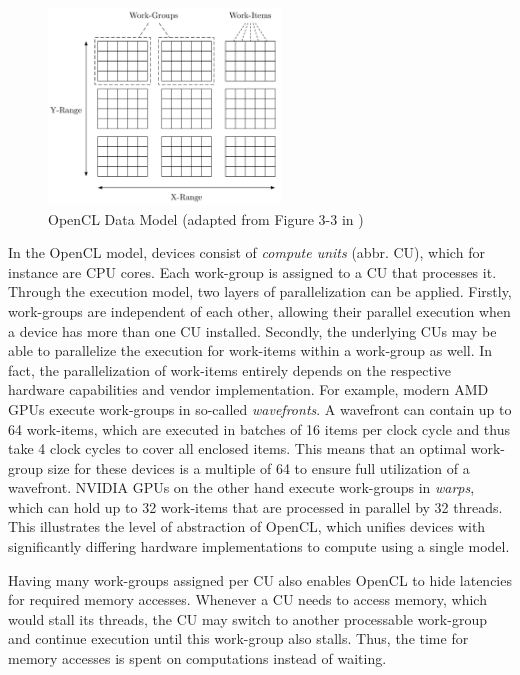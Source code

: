 \begin{figure}[!htb]
	\includegraphics[width=0.55\textwidth]{drawings/opencl_data_model.pdf}
	\centering
	\caption{OpenCL Data Model (adapted from Figure 3-3 in \cite{opencl_spec})}
	\label{img:opencl_data_model}
\end{figure}

In the OpenCL model, devices consist of \textit{compute units} (abbr. CU), which for instance are CPU cores. Each work-group is assigned to a CU that processes it. Through the execution model, two layers of parallelization can be applied. Firstly, work-groups are independent of each other, allowing their parallel execution when a device has more than one CU installed. Secondly, the underlying CUs may be able to parallelize the execution for work-items within a work-group as well. In fact, the parallelization of work-items entirely depends on the respective hardware capabilities and vendor implementation. For example, modern AMD GPUs execute work-groups in so-called \textit{wavefronts}. A wavefront can contain up to 64 work-items, which are executed in batches of 16 items per clock cycle and thus take 4 clock cycles to cover all enclosed items\cite{amd_opencl_spec}. This means that an optimal work-group size for these devices is a multiple of 64 to ensure full utilization of a wavefront.
NVIDIA GPUs on the other hand execute work-groups in \textit{warps}, which can hold up to 32 work-items that are processed in parallel by 32 threads\cite{nvidia_pascal_spec}. This illustrates the level of abstraction of OpenCL, which unifies devices with significantly differing hardware implementations to compute using a single model.

Having many work-groups assigned per CU also enables OpenCL to hide latencies for required memory accesses. Whenever a CU needs to access memory, which would stall its threads, the CU may switch to another processable work-group and continue execution until this work-group also stalls. Thus, the time for memory accesses is spent on computations instead of waiting.

